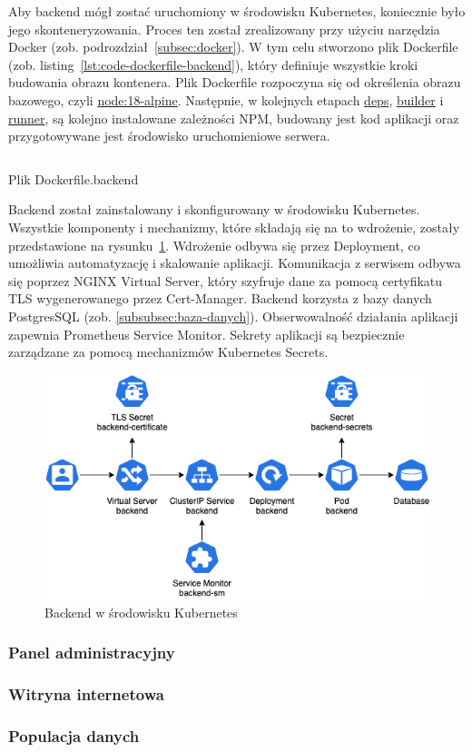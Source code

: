 Aby backend mógł zostać uruchomiony w środowisku Kubernetes, koniecznie było jego skonteneryzowania.
Proces ten został zrealizowany przy użyciu narzędzia Docker (zob. podrozdział~\ref{subsec:docker}).
W tym celu stworzono plik Dockerfile (zob. listing~\ref{lst:code-dockerfile-backend}), który definiuje wszystkie kroki budowania obrazu kontenera.
Plik Dockerfile rozpoczyna się od określenia obrazu bazowego, czyli \url{node:18-alpine}.
Następnie, w kolejnych etapach \url{deps}, \url{builder} i \url{runner}, są kolejno instalowane zależności NPM, budowany jest kod aplikacji oraz przygotowywane jest środowisko uruchomieniowe serwera.

\begin{listing}[H]
    \inputminted[xleftmargin=20pt,linenos]{docker}{code/Dockerfile.backend}
    \caption{Plik Dockerfile.backend}
    \label{lst:code-dockerfile-backend}
\end{listing}

Backend został zainstalowany i skonfigurowany w środowisku Kubernetes.
Wszystkie komponenty i mechanizmy, które składają się na to wdrożenie, zostały przedstawione na rysunku~\ref{fig:kubernetes-backend}.
Wdrożenie odbywa się przez Deployment, co umożliwia automatyzację i skalowanie aplikacji.
Komunikacja z serwisem odbywa się poprzez NGINX Virtual Server, który szyfruje dane za pomocą certyfikatu TLS wygenerowanego przez Cert-Manager.
Backend korzysta z bazy danych PostgresSQL (zob. \autoref{subsubsec:baza-danych}).
Obserwowalność działania aplikacji zapewnia Prometheus Service Monitor.
Sekrety aplikacji są bezpiecznie zarządzane za pomocą mechanizmów Kubernetes Secrets.

\begin{figure}[H]
    \centering
    \includegraphics[width=\textwidth]{img/kubernetes-backend}
    \caption{Backend w środowisku Kubernetes}
    \label{fig:kubernetes-backend}
\end{figure}

\subsubsection{Panel administracyjny}


\subsubsection{Witryna internetowa}


\subsubsection{Populacja danych}

